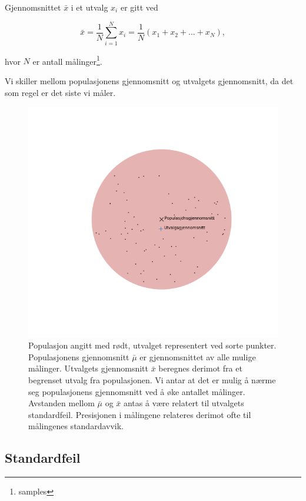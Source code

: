\documentclass[a4paper,9pt]{article}
\begin{document}
Gjennomsnittet $\bar{x}$ i et utvalg $x_i$ er gitt ved

\begin{equation}
\label{eqn:mean}
\bar{x} = \frac{1}{N} \sum_{i=1}^N x_i = \frac{1}{N}(x_1 + x_2 + ... + x_N),
\end{equation}

hvor $N$ er antall målinger\footnote{samples}.

\vspace{.5cm}

Vi skiller mellom populasjonens gjennomsnitt og utvalgets gjennomsnitt, da det som regel er det siste vi måler. 

\begin{figure}[h]
\label{fig:standardfeil}
\centering
\includegraphics[width=\textwidth]{population}
\caption{Populasjon angitt med rødt, utvalget representert ved sorte punkter. Populasjonens gjennomsnitt $\bar{\mu}$ er gjennomsnittet av alle mulige målinger. Utvalgets gjennomsnitt $\bar{x}$ beregnes derimot fra et begrenset utvalg fra populasjonen. Vi antar at det er mulig å nærme seg  populasjonens gjennomsnitt ved å øke antallet målinger. Avstanden mellom $\bar{\mu}$ og $\bar{x}$ antas å være relatert til utvalgets standardfeil. Presisjonen i målingene relateres derimot ofte til målingenes standardavvik.}
\end{figure}

\subsection{Standardfeil}
\end{document}
